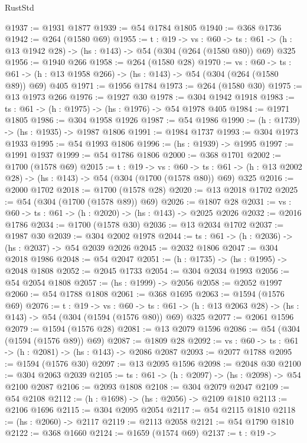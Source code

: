 \begin{lexlean}{RustStd}
\begin{coremodule}
@1937 := @1931 @1877
@1939 := @54 @1784 @1805
@1940 := @368 @1736
@1942 := @264 (@1580 @69)
@1955 := {t : @19} ->
  {vs : @60} ->
  {ts : @61} -> (h : @13 @1942 @28) -> (hs : @143) -> @54 (@304 (@264 (@1580 @80)) @69) @325
@1956 := @1940 @266
@1958 := @264 (@1580 @28)
@1970 := {vs : @60} ->
  {ts : @61} -> (h : @13 @1958 @266) -> (hs : @143) -> @54 (@304 (@264 (@1580 @89)) @69) @405
@1971 := @1956 @1784
@1973 := @264 (@1580 @30)
@1975 := @13 @1973 @266
@1976 := @1927 @30
@1978 := @304 @1942 @1918
@1983 := {ts : @61} -> (h : @1975) -> (hs : @1976) -> @54 @1978 @405
@1984 := @1971 @1805
@1986 := @304 @1958 @1926
@1987 := @54 @1986
@1990 := (h : @1739) -> (hs : @1935) -> @1987 @1806
@1991 := @1984 @1737
@1993 := @304 @1973 @1933
@1995 := @54 @1993 @1806
@1996 := (hs : @1939) -> @1995
@1997 := @1991 @1937
@1999 := @54 @1786 @1806
@2000 := @368 @1701
@2002 := @1700 (@1578 @69)
@2015 := {t : @19} ->
  {vs : @60} ->
  {ts : @61} -> (h : @13 @2002 @28) -> (hs : @143) -> @54 (@304 (@1700 (@1578 @80)) @69) @325
@2016 := @2000 @1702
@2018 := @1700 (@1578 @28)
@2020 := @13 @2018 @1702
@2025 := @54 (@304 (@1700 (@1578 @89)) @69)
@2026 := @1807 @28
@2031 := {vs : @60} -> {ts : @61} -> (h : @2020) -> (hs : @143) -> @2025 @2026
@2032 := @2016 @1786
@2034 := @1700 (@1578 @30)
@2036 := @13 @2034 @1702
@2037 := @1987 @30
@2039 := @304 @2002 @1978
@2044 := {ts : @61} -> (h : @2036) -> (hs : @2037) -> @54 @2039 @2026
@2045 := @2032 @1806
@2047 := @304 @2018 @1986
@2048 := @54 @2047
@2051 := (h : @1735) -> (hs : @1995) -> @2048 @1808
@2052 := @2045 @1733
@2054 := @304 @2034 @1993
@2056 := @54 @2054 @1808
@2057 := (hs : @1999) -> @2056
@2058 := @2052 @1997
@2060 := @54 @1788 @1808
@2061 := @368 @1695
@2063 := @1594 (@1576 @69)
@2076 := {t : @19} ->
  {vs : @60} ->
  {ts : @61} -> (h : @13 @2063 @28) -> (hs : @143) -> @54 (@304 (@1594 (@1576 @80)) @69) @325
@2077 := @2061 @1596
@2079 := @1594 (@1576 @28)
@2081 := @13 @2079 @1596
@2086 := @54 (@304 (@1594 (@1576 @89)) @69)
@2087 := @1809 @28
@2092 := {vs : @60} -> {ts : @61} -> (h : @2081) -> (hs : @143) -> @2086 @2087
@2093 := @2077 @1788
@2095 := @1594 (@1576 @30)
@2097 := @13 @2095 @1596
@2098 := @2048 @30
@2100 := @304 @2063 @2039
@2105 := {ts : @61} -> (h : @2097) -> (hs : @2098) -> @54 @2100 @2087
@2106 := @2093 @1808
@2108 := @304 @2079 @2047
@2109 := @54 @2108
@2112 := (h : @1698) -> (hs : @2056) -> @2109 @1810
@2113 := @2106 @1696
@2115 := @304 @2095 @2054
@2117 := @54 @2115 @1810
@2118 := (hs : @2060) -> @2117
@2119 := @2113 @2058
@2121 := @54 @1790 @1810
@2122 := @368 @1660
@2124 := @1659 (@1574 @69)
@2137 := {t : @19} ->

\end{coremodule}
\end{lexlean}
